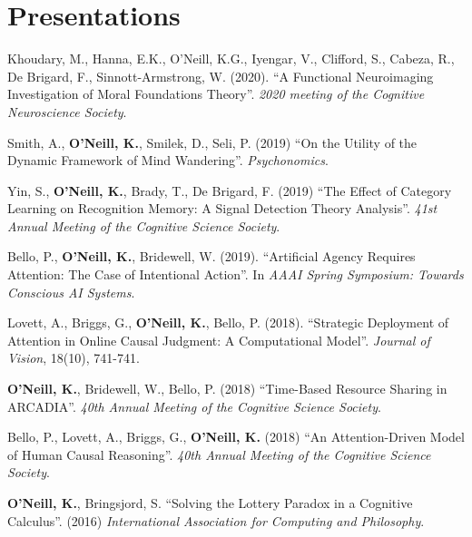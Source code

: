 \section{Presentations}
Khoudary, M., Hanna, E.K., O’Neill, K.G., Iyengar, V., Clifford, S.,
Cabeza, R., De Brigard, F., Sinnott-Armstrong, W. (2020). ``A
Functional Neuroimaging Investigation of Moral Foundations
Theory''. \emph{2020 meeting of the Cognitive Neuroscience Society}.

Smith, A., \textbf{O'Neill, K.}, Smilek, D., Seli, P. (2019) ``On the
Utility of the Dynamic Framework of Mind Wandering''. \emph{Psychonomics}.

Yin, S., \textbf{O'Neill, K.}, Brady, T., De Brigard, F. (2019) ``The
Effect of Category Learning on Recognition Memory: A Signal Detection
Theory Analysis''. \emph{41st Annual Meeting of the Cognitive Science
Society}.

Bello, P., \textbf{O'Neill, K.}, Bridewell, W. (2019). ``Artificial
Agency Requires Attention: The Case of Intentional
Action''. In \emph{AAAI Spring Symposium: Towards Conscious AI
Systems}.

Lovett, A., Briggs, G., \textbf{O'Neill, K.}, Bello,
P. (2018). ``Strategic Deployment of Attention in Online Causal
Judgment: A Computational Model''. \emph{Journal of Vision}, 18(10),
741-741.

\textbf{O'Neill, K.}, Bridewell, W., Bello, P. (2018) ``Time-Based
Resource Sharing in ARCADIA''. \emph{40th Annual Meeting of the
  Cognitive Science Society}.

Bello, P., Lovett, A., Briggs, G., \textbf{O'Neill, K.} (2018) ``An
Attention-Driven Model of Human Causal Reasoning''. \emph{40th Annual
Meeting of the Cognitive Science Society}.
  
\textbf{O’Neill, K.}, Bringsjord, S. ``Solving the Lottery Paradox in a
Cognitive Calculus''. (2016) \emph{International Association for
Computing and Philosophy}.
